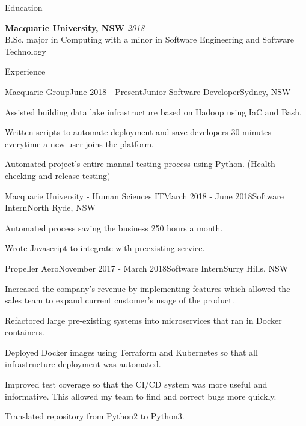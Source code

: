 \documentclass{resume} %
\begin{document}

\begin{rSection}{Education}

{\bf Macquarie University, NSW} \hfill {\em 2018} \\ 
B.Sc. major in Computing with a minor in Software Engineering and Software Technology\\

\end{rSection}


\begin{rSection}{Experience}


\begin{rSubsection}{Macquarie Group}{June 2018 - Present}{Junior Software Developer}{Sydney, NSW}
\item Assisted building data lake infrastructure based on Hadoop using IaC and Bash.
\item Written scripts to automate deployment and save developers 30 minutes everytime a new user joins the platform.
\item Automated project's entire manual testing process using Python. (Health checking and release testing) 
\end{rSubsection}

\begin{rSubsection}{Macquarie University - Human Sciences IT}{March 2018 - June 2018}{Software Intern}{North Ryde, NSW}
\item Automated process saving the business 250 hours a month.
\item Wrote Javascript to integrate with preexisting service.
\end{rSubsection}

\begin{rSubsection}{Propeller Aero}{November 2017 - March 2018}{Software Intern}{Surry Hills, NSW}
\item Increased the company's revenue by implementing features which allowed the sales team to expand current customer's usage of the product.
\item Refactored large pre-existing systems into microservices that ran in Docker containers. 
\item Deployed Docker images using Terraform and Kubernetes so that all infrastructure deployment was automated.
\item Improved test coverage so that the CI/CD system was more useful and informative. This allowed my team to find and correct bugs more quickly.
\item Translated repository from Python2 to Python3.
\end{rSubsection}

\end{rSection}
\end{document}
